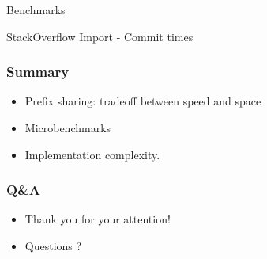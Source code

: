 \documentclass{beamer}
\begin{document}
\begin{section}{Benchmarks}
    \begin{frame}{StackOverflow Import - Commit times}
      \begin{figure}
      \centering
    \end{figure}
    \end{frame}
  \end{section}

  \begin{frame}
    \frametitle{Summary}
      \begin{itemize}
        \item Prefix sharing: tradeoff between speed and space
        \item Microbenchmarks
        \item Implementation complexity.
      \end{itemize}
  \end{frame}

  \begin{frame}
    \frametitle{Q\&A}
      \begin{itemize}
        \item Thank you for your attention!
        \item Questions ?
      \end{itemize}
  \end{frame}
\end{document}
